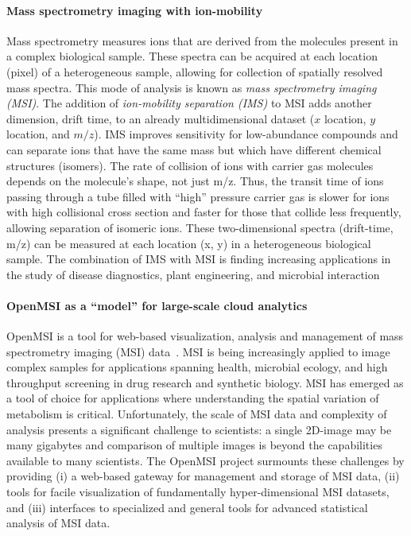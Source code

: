\paragraph{Mass spectrometry imaging with ion-mobility}
Mass spectrometry measures ions that are derived from the molecules present in a complex biological sample.
These spectra can be acquired at each location (pixel) of a heterogeneous sample, allowing for collection of spatially
resolved mass spectra.
This mode of analysis is known as \textit{mass spectrometry imaging (MSI)}.
The addition of \textit{ion-mobility separation (IMS)} to MSI adds another dimension, drift time, to an already multidimensional
dataset ($x$ location, $y$ location, and $m/z$).
IMS improves sensitivity for low-abundance compounds and can separate ions that have the same mass but which have
different chemical structures (isomers).
The rate of collision of ions with carrier gas molecules depends on the molecule's shape, not just m/z.
Thus, the transit time of ions passing through a tube filled with ``high'' pressure carrier gas is slower
for ions with high collisional cross section and faster for those that collide less frequently, allowing separation of
isomeric ions.
These two-dimensional spectra (drift-time, m/z) can be measured at each location (x, y) in a
heterogeneous biological sample.
The combination of IMS with MSI is finding increasing applications in the study of disease diagnostics, plant
engineering, and microbial interaction

\paragraph{OpenMSI as a ``model'' for large-scale cloud analytics}
OpenMSI is a tool for web-based visualization, analysis and
management of mass spectrometry imaging (MSI) data~\cite{OpenMSI}.  MSI is being increasingly applied to image complex samples for
applications spanning health, microbial ecology, and high throughput screening in drug research and synthetic biology.
MSI has emerged as a tool of choice for applications where understanding the spatial variation of metabolism is
critical. Unfortunately, the scale of MSI data and complexity of analysis presents a significant challenge to
scientists: a single 2D-image may be many gigabytes and comparison of multiple images is beyond the capabilities
available to many scientists. The OpenMSI project surmounts these challenges by providing (i) a web-based gateway for
management and storage of MSI data, (ii) tools for facile visualization of fundamentally hyper-dimensional MSI datasets,
and (iii) interfaces to specialized and general tools for advanced statistical analysis of MSI data.

